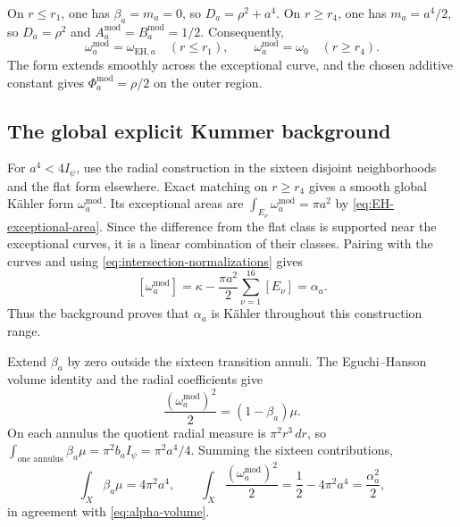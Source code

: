 \documentclass[11pt,a4paper,twoside]{article}
\numberwithin{equation}{section}
\theoremstyle{definition}
\theoremstyle{remark}
\begin{document}
On \(r\le r_1\), one has \(\beta_a=m_a=0\), so
\(D_a=\rho^2+a^4\). On \(r\ge r_4\), one has
\(m_a=a^4/2\), so \(D_a=\rho^2\) and
\(A_a^{\mathrm{mod}}=B_a^{\mathrm{mod}}=1/2\).
Consequently,
\begin{equation}\label{eq:model-matching}
\omega_a^{\mathrm{mod}}=\omega_{\mathrm{EH},a}\quad(r\le r_1),
\qquad \omega_a^{\mathrm{mod}}=\omega_0\quad(r\ge r_4).
\end{equation}
The form extends smoothly across the exceptional curve, and the
chosen additive constant gives \(\Phi_a^{\mathrm{mod}}=\rho/2\)
on the outer region.

\subsection{The global explicit Kummer background}
\label{subsec:global-background}
For \(a^4<4I_\psi\), use the radial construction in the sixteen
disjoint neighborhoods and the flat form elsewhere. Exact matching
on \(r\ge r_4\) gives a smooth global K\"ahler form
\(\omega_a^{\mathrm{mod}}\). Its exceptional areas are
\(\int_{E_\nu}\omega_a^{\mathrm{mod}}=\pi a^2\) by
\eqref{eq:EH-exceptional-area}. Since the difference from the
flat class is supported near the exceptional curves, it is a
linear combination of their classes. Pairing with the curves and
using \eqref{eq:intersection-normalizations} gives
\begin{equation}\label{eq:mod-class}
[\omega_a^{\mathrm{mod}}]
=\kappa-\frac{\pi a^2}{2}\sum_{\nu=1}^{16}[E_\nu]=\alpha_a.
\end{equation}
Thus the background proves that \(\alpha_a\) is K\"ahler
throughout this construction range.

Extend \(\beta_a\) by zero outside the sixteen transition annuli.
The Eguchi--Hanson volume identity and the radial coefficients give
\begin{equation}\label{eq:global-volume-density}
\frac{(\omega_a^{\mathrm{mod}})^2}{2}=(1-\beta_a)\mu.
\end{equation}
On each annulus the quotient radial measure is \(\pi^2r^3\,dr\),
so \(\int_{\text{one annulus}}\beta_a\mu
=\pi^2b_aI_\psi=\pi^2a^4/4\). Summing the sixteen contributions,
\[
\int_X\beta_a\mu=4\pi^2a^4,
\qquad \int_X\frac{(\omega_a^{\mathrm{mod}})^2}{2}
=\frac12-4\pi^2a^4=\frac{\alpha_a^2}{2},
\]
in agreement with \eqref{eq:alpha-volume}.
\end{document}
